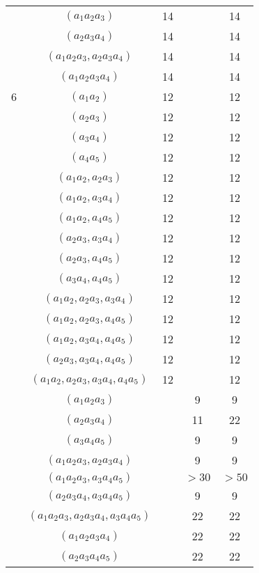 \documentclass{article}
\begin{document}
\begin{flushleft}
\begin{center}
\begin{longtable}{|c|c|c|c|c|}
         & $(a_1a_2a_3)$ & 14 && 14\\
         & $(a_2a_3a_4)$ & 14 && 14\\
         & $(a_1a_2a_3, a_2a_3a_4)$ & 14 && 14\\
         & $(a_1a_2a_3a_4)$ & 14 && 14\\
         \hline
         6 & $(a_1a_2)$ & 12 && 12 \\
         & $(a_2a_3)$ & 12 && 12 \\
         & $(a_3a_4)$ & 12 && 12 \\
         & $(a_4a_5)$ & 12 && 12 \\
         & $(a_1a_2, a_2a_3)$ & 12 && 12 \\
         & $(a_1a_2, a_3a_4)$ & 12 && 12 \\
         & $(a_1a_2, a_4a_5)$ & 12 && 12 \\
         & $(a_2a_3, a_3a_4)$ & 12 && 12 \\
         & $(a_2a_3, a_4a_5)$ & 12 && 12 \\
         & $(a_3a_4, a_4a_5)$ & 12 && 12 \\
         & $(a_1a_2, a_2a_3, a_3a_4)$ & 12 && 12 \\
         & $(a_1a_2, a_2a_3, a_4a_5)$ & 12 && 12 \\
         & $(a_1a_2, a_3a_4, a_4a_5)$ & 12 && 12 \\
         & $(a_2a_3, a_3a_4, a_4a_5)$ & 12 && 12 \\
         & $(a_1a_2, a_2a_3, a_3a_4, a_4a_5)$ & 12 && 12 \\
         & $(a_1a_2a_3)$ && 9 & 9 \\
         \rowcolor{blue!30!white}
         & $(a_2a_3a_4)$ && 11 & 22\\
         & $(a_3a_4a_5)$ && 9 & 9\\
         & $(a_1a_2a_3, a_2a_3a_4)$ && 9 & 9 \\
         \rowcolor{red!30!white}
         & $(a_1a_2a_3, a_3a_4a_5)$ && $>30$ & $>50$ \\
         & $(a_2a_3a_4, a_3a_4a_5)$ && 9 & 9\\
         & $(a_1a_2a_3, a_2a_3a_4, a_3a_4a_5)$ && 22 & 22 \\
         & $(a_1a_2a_3a_4)$ && 22 & 22\\
         & $(a_2a_3a_4a_5)$ && 22 & 22\\

\end{longtable}
\end{center}
\end{flushleft}
\end{document}
